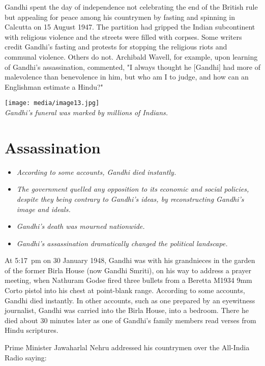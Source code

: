 Gandhi spent the day of independence not celebrating the end of the
British rule but appealing for peace among his countrymen by fasting and
spinning in Calcutta on 15 August 1947. The partition had gripped the
Indian subcontinent with religious violence and the streets were filled
with corpses. Some writers credit Gandhi's fasting and protests for
stopping the religious riots and communal violence. Others do not.
Archibald Wavell, for example, upon learning of Gandhi's assassination,
commented, "I always thought he {[}Gandhi{]} had more of malevolence
than benevolence in him, but who am I to judge, and how can an
Englishman estimate a Hindu?"

\texttt{[image: media/image13.jpg]}\\
\emph{Gandhi's funeral was marked by millions of Indians.}

\section{Assassination}\label{assassination}

\begin{itemize}
\item
  \emph{According to some accounts, Gandhi died instantly.}
\item
  \emph{The government quelled any opposition to its economic and social
  policies, despite they being contrary to Gandhi's ideas, by
  reconstructing Gandhi's image and ideals.}
\item
  \emph{Gandhi's death was mourned nationwide.}
\item
  \emph{Gandhi's assassination dramatically changed the political
  landscape.}
\end{itemize}

At 5:17~pm on 30 January 1948, Gandhi was with his grandnieces in the
garden of the former Birla House (now Gandhi Smriti), on his way to
address a prayer meeting, when Nathuram Godse fired three bullets from a
Beretta M1934 9mm Corto pistol into his chest at point-blank range.
According to some accounts, Gandhi died instantly. In other accounts,
such as one prepared by an eyewitness journalist, Gandhi was carried
into the Birla House, into a bedroom. There he died about 30 minutes
later as one of Gandhi's family members read verses from Hindu
scriptures.

Prime Minister Jawaharlal Nehru addressed his countrymen over the
All-India Radio saying:

